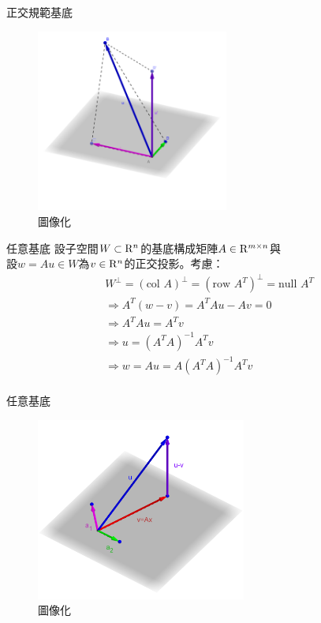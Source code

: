 \documentclass[14pt]{beamer}
\begin{document}
\begin{frame}{正交規範基底}
	\begin{figure}[H]
		\centering
		\includegraphics[height=6cm]{coordinate.png}
		\caption{圖像化}
		\label{fig:orthon}
	\end{figure}
\end{frame}
\begin{frame}{任意基底}
	設子空間$W\subset {{\rm{R}}^{n}}$的基底構成矩陣$A\in {{\rm{R}}^{m\times n}}$與\\
	設$w=Au\in W$為$v\in {{\rm{R}}^{n}}$的正交投影。考慮：
	\begin{align*}
	& {{W}^{\bot }}={{(\text{col }A)}^{\bot }}={{(\text{row }{{A}^{T}})}^{\bot }}=\text{null }{{A}^{T}} \\ 
	& \Rightarrow {{A}^{T}}(w-v)={{A}^{T}}Au-Av=0 \\ 
	& \Rightarrow {{A}^{T}}Au={{A}^{T}}v \\ 
	& \Rightarrow u={{({{A}^{T}}A)}^{-1}}{{A}^{T}}v \\ 
	& \Rightarrow w=Au=A{{({{A}^{T}}A)}^{-1}}{{A}^{T}}v \\ 
	\end{align*}
	
	
\end{frame}
\begin{frame}{任意基底}
	\begin{figure}[H]
		\centering
		\includegraphics[height=6cm]{Pw.png}
		\caption{圖像化}
		\label{fig:any}
	\end{figure}
\end{frame}
\end{document}
